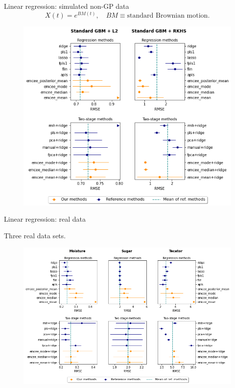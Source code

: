 \documentclass[9pt, english, professionalfonts]{beamer}
\begin{document}
\begin{frame}{Linear regression: simulated non-GP data}
  \[
  X(t) = e^{BM(t)}, \quad BM \equiv \text{standard Brownian motion}.
  \]
  \begin{figure}
    \includegraphics[width=.6\textwidth]{reg_emcee_nongp}
  \end{figure}
\end{frame}

\begin{frame}{Linear regression: real data}
  \begin{center}
    Three real data sets.
  \end{center}
    \vspace{.5em}
  \begin{figure}
    \includegraphics[width=.8\textwidth]{reg_emcee_real}
  \end{figure}
\end{frame}
\end{document}
